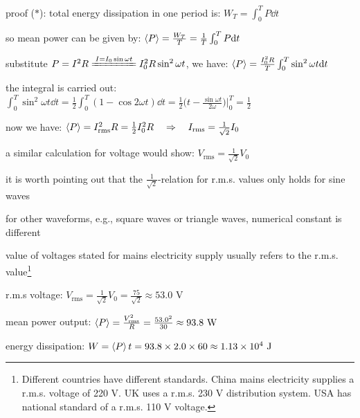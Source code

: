 \begin{compactenum}
	\item[proof ($\ast$):] total energy dissipation in one period is: $W_T = \int^T_0 P \dd  t$
	
	\eqyskip
	
	so mean power can be given by: $\left< P \right> = \frac{W_T}{T} = \frac{1}{T} \int^T_0 P \mathrm{d} t$
	
	\eqyskip
	
	substitute $P=I^2 R \xlongequal{I=I_0\sin\omega t} I^2_0 R \sin^2 \omega t$, we have: $\left< P \right> = \frac{I^2_0 R}{T} \int^T_0 \sin^2 \omega t \mathrm{d} t$
	
	\eqyskip
	
	the integral is carried out: $\int^T_0 \sin^2 \omega t \dd t = \frac{1}{2} \int_0^T (1-\cos2 \omega t) \dd t = \frac{1}{2} \Big(t - \frac{\sin \omega t}{2\omega} \Big) \Bigg|_0^T = \frac{1}{2}$
	
	\eqyskip
	
	now we have: $\left< P \right> = I_\text{rms}^2 R = \frac{1}{2} I_0^2 R \quad \Rightarrow \quad I_\text{rms} = \frac{1}{\sqrt{2}} I_0$
	
	a similar calculation for voltage would show: $V_\text{rms} = \frac{1}{\sqrt{2}} V_0$  \eoe
\end{compactenum}

\cmt it is worth pointing out that the $\tfrac{1}{\sqrt{2}}$-relation for r.m.s. values only holds for sine waves

for other waveforms, e.g., square waves or triangle waves, numerical constant is different

\cmt value of voltages stated for mains electricity supply usually refers to the r.m.s. value\footnote{Different countries have different standards. China mains electricity supplies a r.m.s. voltage of 220 V. UK uses a r.m.s. 230 V distribution system. USA has national standard of a r.m.s. 110 V voltage.}


\sol r.m.s voltage: $V_\text{rms} = \frac{1}{\sqrt{2}} V_0 = \frac{75}{\sqrt{2}} \approx 53.0 \text{ V}$

\eqyskip

mean power output: $\left< P \right> = \frac{V^2_\text{rms}}{R} = \frac{53.0^2}{30} \approx 93.8 \text{ W}$

energy dissipation: $W = \left< P \right> t = 93.8 \times 2.0 \times 60 \approx 1.13 \times 10^4 \text{ J}$ \eoe

